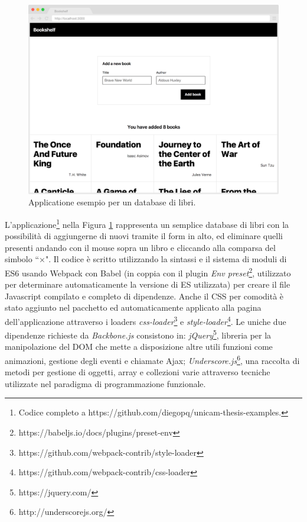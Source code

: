 \begin{figure}[h]
\centering
\includegraphics[width=14cm]{./images/bookshelfApplication1}
\caption{Applicatione esempio per un database di libri.}
\label{bookshelfApplication1}
\end{figure}

L'applicazione\footnote{Codice completo a https://github.com/diegopq/unicam-thesis-examples.} nella Figura \ref{bookshelfApplication1} rappresenta un semplice database di libri con la possibilità di aggiungerne di nuovi tramite il form in alto, ed eliminare quelli presenti andando con il mouse sopra un libro e cliccando alla comparsa del simbolo “×".
Il codice è scritto utilizzando la sintassi e il sistema di moduli di ES6 usando Webpack con Babel (in coppia con il plugin \textit{Env preset}\footnote{https://babeljs.io/docs/plugins/preset-env}, utilizzato per determinare automaticamente la versione di ES utilizzata) per creare il file Javascript compilato e completo di dipendenze. Anche il CSS per comodità è stato aggiunto nel pacchetto ed automaticamente applicato alla pagina dell'applicazione attraverso i loaders \textit{css-loader}\footnote{https://github.com/webpack-contrib/style-loader} e \textit{style-loader}\footnote{https://github.com/webpack-contrib/css-loader}.
Le uniche due dipendenze richieste da \textit{Backbone.js} consistono in: \textit{jQuery}\footnote{https://jquery.com/}, libreria per la manipolazione del DOM che mette a disposizione altre utili funzioni come animazioni, gestione degli eventi e chiamate Ajax; \textit{Underscore.js}\footnote{http://underscorejs.org/}, una raccolta di metodi per gestione di oggetti, array e collezioni varie attraverso tecniche utilizzate nel paradigma di programmazione funzionale.

